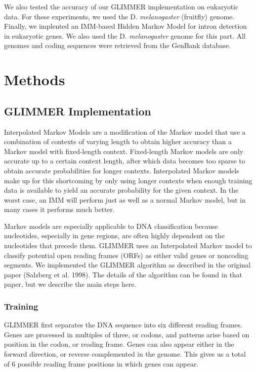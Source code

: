 \documentclass[11pt,letterpaper]{article}
\begin{document}
We also tested the accuracy of our GLIMMER implementation on eukaryotic data. For these experiments, we used the D. \emph{melanogaster} (fruitfly) genome. Finally, we implented an IMM-based Hidden Markov Model for intron detection in eukaryotic genes. We also used the D. \emph{melanogaster} genome for this part. All genomes and coding sequences were retrieved from the GenBank database.

\section{Methods}
\subsection{GLIMMER Implementation}

Interpolated Markov Models are a modification of the Markov model that use a combination of contexts of varying length to obtain higher accuracy than a Markov model with fixed-length context. Fixed-length Markov models are only accurate up to a certain context length, after which data becomes too sparse to obtain accurate probabilities for longer contexts. Interpolated Markov models make up for this shortcoming by only using longer contexts when enough training data is available to yield an accurate probability for the given context. In the worst case, an IMM will perform just as well as a normal Markov model, but in many cases it performs much better. 

Markov models are especially applicable to DNA classification because nucleotides, especially in gene regions, are often highly dependent on the nucleotides that precede them. GLIMMER uses an Interpolated Markov model to classify potential open reading frames (ORFs) as either valid genes or noncoding segments. We implemented the GLIMMER algorithm as described in the original paper (Salzberg et al. 1998). The details of the algorithm can be found in that paper, but we describe the main steps here.

\subsubsection{Training}
GLIMMER first separates the DNA sequence into six different reading frames. Genes are processed in multiples of three, or codons, and patterns arise based on position in the codon, or reading frame. Genes can also appear either in the forward direction, or reverse complemented in the genome. This gives us a total of 6 possible reading frame positions in which genes can appear.
\end{document}
